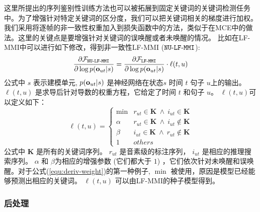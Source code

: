 这里所提出的序列鉴别性训练方法也可以被拓展到固定关键词的关键词检测任务中。为了增强针对特定关键词的区分度，我们可以把关键词相关的梯度进行加权。我们采用将逐帧的非一致性权重加入到损失函数中的方法，类似于\cite{meng2016non}在MCE中的做法。这里的关键点是要增强针对关键词的误唤醒或者未唤醒的情况。
比如在LF-MMI中可以进行如下修改，得到非一致性LF-MMI ($\tt{NU\text{-}LF\text{-}MMI}$):
\begin{equation}
\label{equ:kws-nummi}
\begin{split}
\frac{\partial \mathcal{F}_{\tt{NU\text{-}LF\text{-}MMI}}}{\partial\log p({\bf o}_{ut}|s)}
=\frac{\partial \mathcal{F}_{\tt{LF\text{-}MMI}}}{\partial\log p({\bf o}_{ut}|s)}\cdot  \ell(t,u)
\end{split}
\end{equation}
公式中 $s$ 表示建模单元, $p({\bf o}_{ut}|s)$ 是神经网络在状态$s$ 时间 $t$ 句子 $u$上的输出。
$\ell(t,u)$ 是求导后针对导数的权重方程，它给定了时间 $t$ 和句子 $u$。 $\ell(t,u)$可以定义如下：
\begin{equation}
\label{equ:deriv-weight}
\ell(t,u)=
\begin{cases}
\mathop{\min(\alpha,\beta)}& r_{ut}\in \mathbf{K}\ \land\ i_{ut}\in \mathbf{K}\\
\alpha& r_{ut}\in \mathbf{K}\ \land\ i_{ut}\notin \mathbf{K}\\
\beta& i_{ut}\in \mathbf{K}\ \land\ r_{ut}\notin \mathbf{K}\\
1& others
\end{cases}
\end{equation}
公式中 $\mathbf{K}$ 是所有的关键词序列。 $r_{ut}$   是音素级的标注序列， $i_{ut}$ 是相应的推理搜索序列。 $\alpha$ 和 $\beta$为相应的增强参数 (它们都大于 $1$) ，它们依次针对未唤醒和误唤醒。对于公式(\ref{equ:deriv-weight})的第一种例子, $\mathop{\min(\alpha,\beta)}$ 被使用，原因是模型已经能够预测出相应的关键词。 $\ell(t,u)$ 可以由LF-MMI的种子模型得到。

\subsubsection{后处理}
\label{Sec:post-process}

